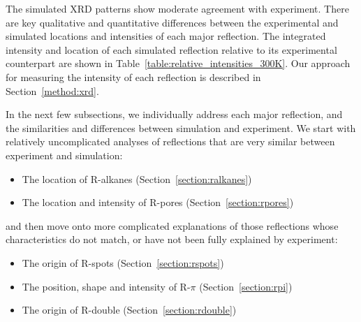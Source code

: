   The simulated XRD patterns show moderate agreement with experiment. There 
  are key qualitative and quantitative differences between the experimental and simulated
  locations and intensities of each major reflection. The integrated intensity and location
  of each simulated reflection relative to its experimental counterpart are shown in  
  Table~\ref{table:relative_intensities_300K}. Our approach for measuring the intensity of
  each reflection is described in Section~\ref{method:xrd}. 

  In the next few subsections, we individually address each major reflection, and the
  similarities and differences between simulation and experiment. We start with relatively 
  uncomplicated analyses of reflections that are very similar between experiment and simulation:
  \begin{itemize}
  	\item The location of R-alkanes (Section~\ref{section:ralkanes})
  	\item The location and intensity of R-pores (Section~\ref{section:rpores})
  \end{itemize}
  and then move onto more complicated explanations of those reflections whose characteristics
  do not match, or have not been fully explained by experiment:
  \begin{itemize}
  	\item The origin of R-spots (Section~\ref{section:rspots})
  	\item The position, shape and intensity of R-$\pi$ (Section~\ref{section:rpi})
  	\item The origin of R-double (Section~\ref{section:rdouble})
  \end{itemize}
  
